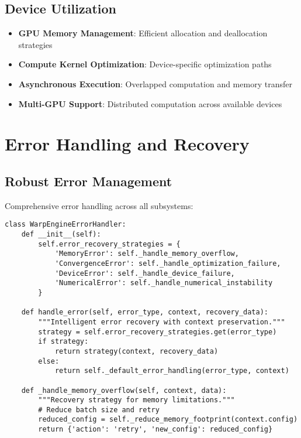 \documentclass{article}
\begin{document}
\subsection{Device Utilization}

\begin{itemize}
\item \textbf{GPU Memory Management}: Efficient allocation and deallocation strategies
\item \textbf{Compute Kernel Optimization}: Device-specific optimization paths
\item \textbf{Asynchronous Execution}: Overlapped computation and memory transfer
\item \textbf{Multi-GPU Support}: Distributed computation across available devices
\end{itemize}

\section{Error Handling and Recovery}

\subsection{Robust Error Management}

Comprehensive error handling across all subsystems:

\begin{lstlisting}
class WarpEngineErrorHandler:
    def __init__(self):
        self.error_recovery_strategies = {
            'MemoryError': self._handle_memory_overflow,
            'ConvergenceError': self._handle_optimization_failure,
            'DeviceError': self._handle_device_failure,
            'NumericalError': self._handle_numerical_instability
        }
    
    def handle_error(self, error_type, context, recovery_data):
        """Intelligent error recovery with context preservation."""
        strategy = self.error_recovery_strategies.get(error_type)
        if strategy:
            return strategy(context, recovery_data)
        else:
            return self._default_error_handling(error_type, context)
    
    def _handle_memory_overflow(self, context, data):
        """Recovery strategy for memory limitations."""
        # Reduce batch size and retry
        reduced_config = self._reduce_memory_footprint(context.config)
        return {'action': 'retry', 'new_config': reduced_config}
\end{lstlisting}
\end{document}
